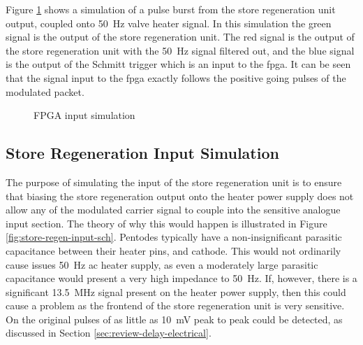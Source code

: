 Figure \ref{fig:fpga-input-sim} shows a simulation of a pulse burst from the store regeneration unit output, coupled onto \SI{50}{\hertz} valve heater signal. In this simulation the green signal is the output of the store regeneration unit. The red signal is the output of the store regeneration unit with the \SI{50}{\hertz} signal filtered out, and the blue signal is the output of the Schmitt trigger which is an input to the \gls{fpga}. It can be seen that the signal input to the \gls{fpga} exactly follows the positive going pulses of the modulated packet.


\begin{figure}[ht]
	\centering
	\caption{FPGA input simulation}
	\label{fig:fpga-input-sim}
\end{figure}

\subsection{Store Regeneration Input Simulation}
The purpose of simulating the input of the store regeneration unit is to ensure that biasing the store regeneration output onto the heater power supply does not allow any of the modulated carrier signal to couple into the sensitive analogue input section. The theory of why this would happen is illustrated in Figure \ref{fig:store-regen-input-sch}. Pentodes typically have a non-insignificant parasitic capacitance between their heater pins, and cathode. This would not ordinarily cause issues \SI{50}{\hertz} \gls{ac} heater supply, as even a moderately large parasitic capacitance would present a very high impedance to \SI{50}{\hertz}. If, however, there is a significant \SI{13.5}{\mega\hertz} signal present on the heater power supply, then this could cause a problem as the frontend of the store regeneration unit is very sensitive. On the original pulses of as little as \SI{10}{\milli\volt} peak to peak could be detected, as discussed in Section \ref{sec:review-delay-electrical}.

